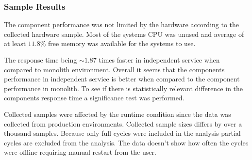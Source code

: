 \subsubsection{Sample Results}
The component performance was not limited by the hardware according to the collected hardware sample.
Most of the systems CPU was unused and average of at least $11.8\%$ free memory was available for the systems to use.

The response time being $\sim 1.87$ times faster in independent service when compared to monolith environment.
Overall it seems that the components performance in independent service is better when compared to the component performance in monolith.
To see if there is statistically relevant difference in the components response time a significance test was performed.

Collected samples were affected by the runtime condition since the data was collected from production environments.
Collected sample sizes differs by over a thousand samples.
Because only full cycles were included in the analysis partial cycles are excluded from the analysis.
The data doesn't show how often the cycles were offline requiring manual restart from the user.
